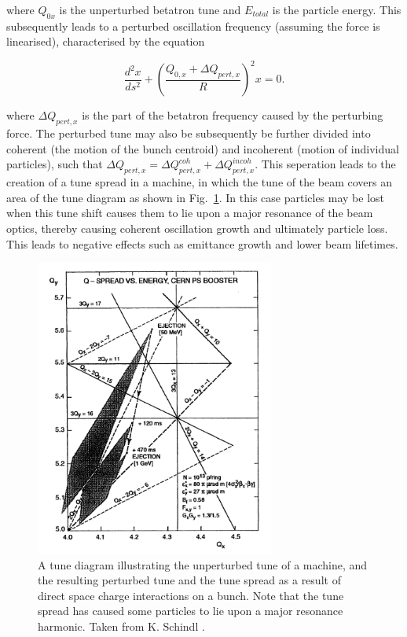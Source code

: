 where $Q_{0x}$ is the unperturbed betatron tune and $E_{total}$ is the particle energy. This subsequently leads to a perturbed oscillation frequency (assuming the force is linearised), characterised by the equation

\begin{equation}
\frac{d^{2}x}{ds^{2}} + \left(\frac{Q_{0,x}+ \Delta Q_{pert,x}}{R}\right)^{2} x = 0.
\end{equation}

where $\Delta Q_{pert,x}$ is the part of the betatron frequency caused by the perturbing force. The perturbed tune may also be subsequently be further divided into coherent (the motion of the bunch centroid) and incoherent (motion of individual particles), such that $\Delta Q_{pert,x} = \Delta Q^{coh}_{pert, x} + \Delta Q^{incoh}_{pert, x}$. This seperation leads to the creation of a tune spread in a machine, in which the tune of the beam covers an area of the tune diagram as shown in Fig.~\ref{fig:tune_diag_tune_shift}. In this case particles may be lost when this tune shift causes them to lie upon a major resonance of the beam optics, thereby causing coherent oscillation growth and ultimately particle loss. This leads to negative effects such as emittance growth and lower beam lifetimes.

\begin{figure}
\begin{center}
\includegraphics[width=0.7\textwidth]{Wakefields_and_Impedances/figures/tune-spread-sc.png}
\end{center}
\caption{A tune diagram illustrating the unperturbed tune of a machine, and the resulting perturbed tune and the tune spread as a result of direct space charge interactions on a bunch. Note that the tune spread has caused some particles to lie upon a major resonance harmonic. Taken from K. Schindl \cite{Schindl:SpaceCharge}.}
\label{fig:tune_diag_tune_shift}
\end{figure}

